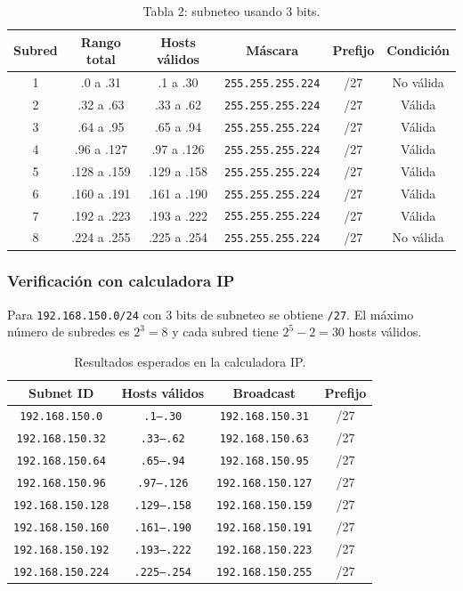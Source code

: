 \documentclass[a4paper,12pt]{article}
\newcommand{\ip}[1]{\mbox{\texttt{#1}}}
\begin{document}
\begin{table}[H]
\centering
\small
\begin{tabular}{|c|c|c|c|c|c|}
\hline
Subred & Rango total & Hosts válidos & Máscara & Prefijo & Condición \\
\hline
1 & .0 a .31 & .1 a .30 & \ip{255.255.255.224} & /27 & No válida \\
2 & .32 a .63 & .33 a .62 & \ip{255.255.255.224} & /27 & Válida \\
3 & .64 a .95 & .65 a .94 & \ip{255.255.255.224} & /27 & Válida \\
4 & .96 a .127 & .97 a .126 & \ip{255.255.255.224} & /27 & Válida \\
5 & .128 a .159 & .129 a .158 & \ip{255.255.255.224} & /27 & Válida \\
6 & .160 a .191 & .161 a .190 & \ip{255.255.255.224} & /27 & Válida \\
7 & .192 a .223 & .193 a .222 & \ip{255.255.255.224} & /27 & Válida \\
8 & .224 a .255 & .225 a .254 & \ip{255.255.255.224} & /27 & No válida \\
\hline
\end{tabular}
\caption{Tabla 2: subneteo usando 3 bits.}
\end{table}

\subsubsection{Verificación con calculadora IP}

Para \ip{192.168.150.0/24} con 3 bits de subneteo se obtiene \ip{/27}. El máximo número de subredes es $2^3 = 8$ y cada subred tiene $2^5 - 2 = 30$ hosts válidos.

\begin{table}[H]
\centering
\small
\begin{tabular}{|c|c|c|c|}
\hline
Subnet ID & Hosts válidos & Broadcast & Prefijo \\
\hline
\ip{192.168.150.0} & \ip{.1--.30} & \ip{192.168.150.31} & /27 \\
\ip{192.168.150.32} & \ip{.33--.62} & \ip{192.168.150.63} & /27 \\
\ip{192.168.150.64} & \ip{.65--.94} & \ip{192.168.150.95} & /27 \\
\ip{192.168.150.96} & \ip{.97--.126} & \ip{192.168.150.127} & /27 \\
\ip{192.168.150.128} & \ip{.129--.158} & \ip{192.168.150.159} & /27 \\
\ip{192.168.150.160} & \ip{.161--.190} & \ip{192.168.150.191} & /27 \\
\ip{192.168.150.192} & \ip{.193--.222} & \ip{192.168.150.223} & /27 \\
\ip{192.168.150.224} & \ip{.225--.254} & \ip{192.168.150.255} & /27 \\
\hline
\end{tabular}
\caption{Resultados esperados en la calculadora IP.}
\end{table}
\end{document}
